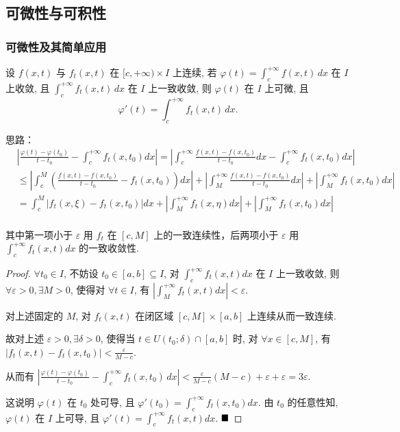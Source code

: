 \documentclass[lang=cn,newtx,10pt,scheme=chinese]{elegantbook}
\begin{document}
\subsection{可微性与可积性}

\subsubsection{可微性及其简单应用}

\begin{theorem}[可微性]\label{含参变量反常积分_可微性定理}
设 $f(x, t)$ 与 $f_t(x, t)$ 在 $[c, +\infty) \times I$ 上连续, 若 $\varphi(t) = \int_{c}^{+\infty} f(x, t) \,dx$ 在 $I$ 上收敛, 且 $\int_{c}^{+\infty} f_t(x, t) \,dx$ 在 $I$ 上一致收敛, 则 $\varphi(t)$ 在 $I$ 上可微, 且
$$
\varphi'(t) = \int_{c}^{+\infty} f_t(x, t) \,dx.
$$
\end{theorem}

\begin{note}
思路：
\begin{align*}
&\left|\frac{\varphi(t)-\varphi(t_0)}{t-t_0} - \int_c^{+\infty} f_t(x,t_0)dx\right| = \left|\int_c^{+\infty} \frac{f(x,t)-f(x,t_0)}{t-t_0} dx - \int_c^{+\infty} f_t(x,t_0)dx\right|\\
&\le \left|\int_c^M \left(\frac{f(x,t)-f(x,t_0)}{t-t_0} - f_t(x,t_0)\right) dx\right| + \left|\int_M^{+\infty} \frac{f(x,t)-f(x,t_0)}{t-t_0} dx\right| + \left|\int_M^{+\infty} f_t(x,t_0) dx\right|\\
&= \int_c^M |f_t(x,\xi)-f_t(x,t_0)|dx + \left|\int_M^{+\infty} f_t(x,\eta)dx\right| + \left|\int_M^{+\infty} f_t(x,t_0)dx\right|\\
\end{align*}

其中第一项小于 $\varepsilon$ 用 $f_t$ 在 $[c,M]$ 上的一致连续性，后两项小于 $\varepsilon$ 用 $\int_c^{+\infty} f_t(x,t)dx$ 的一致收敛性.

\end{note}

\begin{proof}
 $\forall t_0 \in I$, 不妨设 $t_0 \in [a,b] \subseteq I$, 对 $\int_c^{+\infty} f_t(x,t)dx$ 在 $I$ 上一致收敛, 则 $\forall \varepsilon > 0, \exists M > 0$, 使得对 $\forall t \in I$, 有 $|\int_M^{+\infty} f_t(x,t)dx| < \varepsilon$.

对上述固定的 $M$, 对 $f_t(x,t)$ 在闭区域 $[c,M] \times [a,b]$ 上连续从而一致连续.

故对上述 $\varepsilon>0, \exists \delta>0$, 使得当 $t \in U(t_0; \delta) \cap [a,b]$ 时, 对 $\forall x \in [c,M]$, 有 $|f_t(x,t)-f_t(x,t_0)| < \frac{\varepsilon}{M-c}$.

从而有 $\left|\frac{\varphi(t) - \varphi(t_0)}{t - t_0} - \int_c^{+\infty} f_t(x, t_0) \,dx\right| < \frac{\varepsilon}{M-c}(M-c) + \varepsilon + \varepsilon = 3\varepsilon$.

这说明 $\varphi(t)$ 在 $t_0$ 处可导, 且 $\varphi'(t_0) = \int_c^{+\infty} f_t(x,t_0)dx$. 由 $t_0$ 的任意性知, $\varphi(t)$ 在 $I$ 上可导, 且 $\varphi'(t) = \int_c^{+\infty} f_t(x,t)dx$.
$\hfill \blacksquare$
\end{proof}
\end{document}
